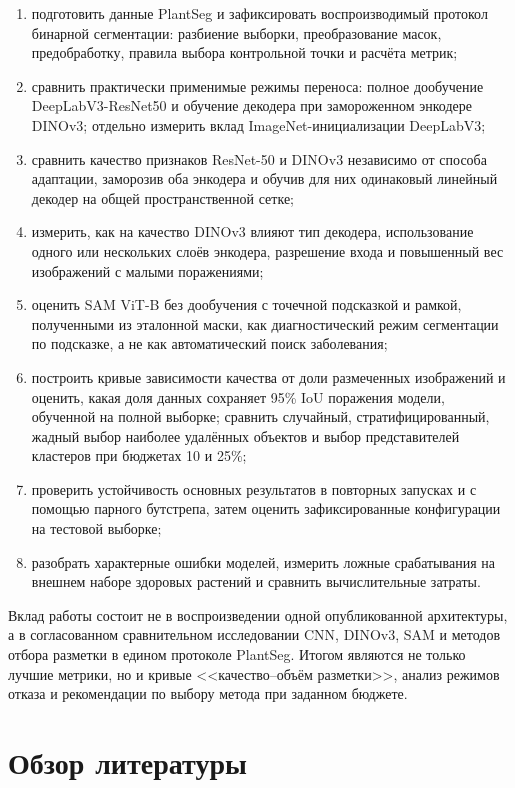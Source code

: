 \documentclass[a4paper,12pt]{extarticle}
\begin{document}
\begin{enumerate}
  \item подготовить данные PlantSeg и зафиксировать воспроизводимый протокол
  бинарной сегментации: разбиение выборки, преобразование масок, предобработку,
  правила выбора контрольной точки и расчёта метрик;
  \item сравнить практически применимые режимы переноса: полное дообучение
  DeepLabV3-ResNet50 и обучение декодера при замороженном энкодере DINOv3;
  отдельно измерить вклад ImageNet-инициализации DeepLabV3;
  \item сравнить качество признаков ResNet-50 и DINOv3 независимо от способа
  адаптации, заморозив оба энкодера и обучив для них одинаковый линейный
  декодер на общей пространственной сетке;
  \item измерить, как на качество DINOv3 влияют тип декодера, использование
  одного или нескольких слоёв энкодера, разрешение входа и повышенный вес
  изображений с малыми поражениями;
  \item оценить SAM ViT-B без дообучения с точечной подсказкой и рамкой,
  полученными из эталонной маски, как диагностический режим сегментации по
  подсказке, а не как автоматический поиск заболевания;
  \item построить кривые зависимости качества от доли размеченных изображений
  и оценить, какая доля данных сохраняет 95\% IoU поражения модели, обученной
  на полной выборке; сравнить случайный, стратифицированный, жадный выбор наиболее
  удалённых объектов и выбор представителей кластеров при бюджетах 10 и 25\%;
  \item проверить устойчивость основных результатов в повторных запусках и с
  помощью парного бутстрепа, затем оценить зафиксированные конфигурации на
  тестовой выборке;
  \item разобрать характерные ошибки моделей, измерить ложные срабатывания на
  внешнем наборе здоровых растений и сравнить вычислительные затраты.
\end{enumerate}

Вклад работы состоит не в воспроизведении одной опубликованной
архитектуры, а в согласованном сравнительном исследовании CNN, DINOv3, SAM и методов
отбора разметки в едином протоколе PlantSeg. Итогом являются не только лучшие
метрики, но и кривые <<качество--объём разметки>>, анализ режимов отказа и
рекомендации по выбору метода при заданном бюджете.

\section{Обзор литературы}
\end{document}
